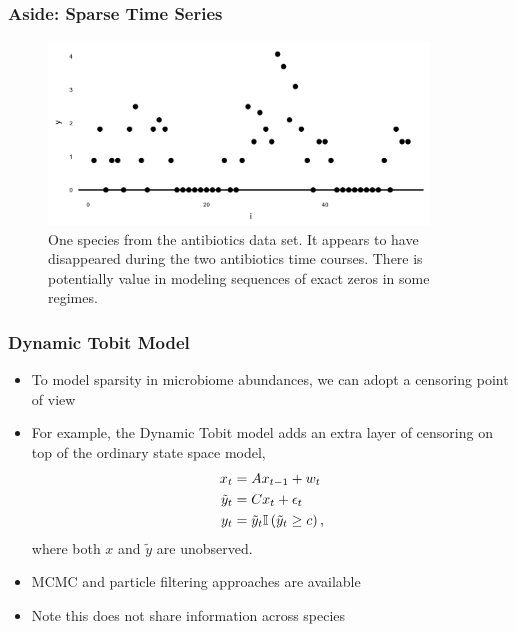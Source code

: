 \documentclass{beamer}
\begin{document}
\begin{frame}
  \frametitle{Aside: Sparse Time Series}
\begin{figure}[ht]
  \centering
  \includegraphics[width=0.9\textwidth]{figure/abt_zeros}
  \caption{One species from the antibiotics data set. It appears to have
    disappeared during the two antibiotics time courses. There is potentially
    value in modeling sequences of exact zeros in some regimes.
    \label{fig:abt_zeros} }
\end{figure}

\end{frame}

\begin{frame}
  \frametitle{Dynamic Tobit Model}
  \begin{itemize}
  \item To model sparsity in microbiome abundances, we can adopt a censoring
    point of view
  \item For example, the Dynamic Tobit model adds an extra layer of censoring on
    top of the ordinary state space model,
    \begin{align*}
      x_{t} &= Ax_{t - 1} + w_{t} \\
      \tilde{y}_{t} &= Cx_{t} + \epsilon_{t} \\
      y_{t} &= \tilde{y}_{t} \mathbb{I}\left({\tilde{y}_{t} \geq c}\right),
    \end{align*}
    where both $x$ and $\tilde{y}$ are unobserved.
  \item MCMC \citep{de1997scan, brockwell2006long, manrique1998simulation} and
    particle filtering \citep{andrieu2002particle} approaches are available
  \item Note this does not share information across species
  \end{itemize}
\end{frame}
\end{document}

